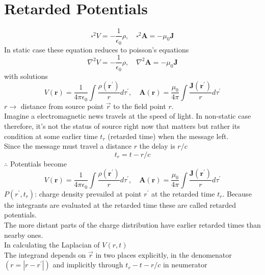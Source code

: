 \section{Retarded Potentials}
$$\square^{2} V=-\frac{1}{\epsilon_{0}} \rho, \quad \square^{2} \mathbf{A}=-\mu_{0} \mathbf{J}$$
In static case these equation reduces to poisson's equations
$$\nabla^{2} V=-\frac{1}{\epsilon_{0}} \rho, \quad \nabla^{2} \mathbf{A}=-\mu_{0} \mathbf{J}$$
with solutions
$$V(\mathbf{r})=\frac{1}{4 \pi \epsilon_{0}} \int \frac{\rho\left(\mathbf{r}^{\prime}\right)}{r} d \tau^{\prime}, \quad \mathbf{A}(\mathbf{r})=\frac{\mu_{0}}{4 \pi} \int \frac{\mathbf{J}\left(\mathbf{r}^{\prime}\right)}{r} d \tau^{\prime}$$
$r \rightarrow$ distance from source point $\vec{r}$ to the field point $r$.\\
Imagine a electromagnetic news travels at the speed of light. In non-static case therefore, it's not the status of source right now that matters but rather its condition at some earlier time $t_r$ (retarded time) when the message left.\\
Since the message must travel a distance $r$ the delay is $r/c$
$$t_{r}=t-r / c$$
$\therefore$ Potentials become
$$V(\mathbf{r})=\frac{1}{4 \pi \epsilon_{0}} \int \frac{\rho\left(\mathbf{r}^{\prime}\right)}{r} d \tau^{\prime}, \quad \mathbf{A}(\mathbf{r})=\frac{\mu_{0}}{4 \pi} \int \frac{\mathbf{J}\left(\mathbf{r}^{\prime}\right)}{r} d \tau^{\prime}$$
$P(r^\prime,t_r)$: charge density prevailed at point $r^\prime$ at the retarded time $t_r$. Because the integrants are evaluated at the retarded time these are called retarded potentials.\\
The more distant parts of the charge distribution have earlier retarded times than nearby ones.\\
In calculating the Laplacian of $V(r,t)$\\
The integrand depends on $\vec{r}$ in two places explicitly, in the denomenator $(r=|r-r^\prime|)$ and implicitly through $t_r-t-r/c$ in neumerator 

